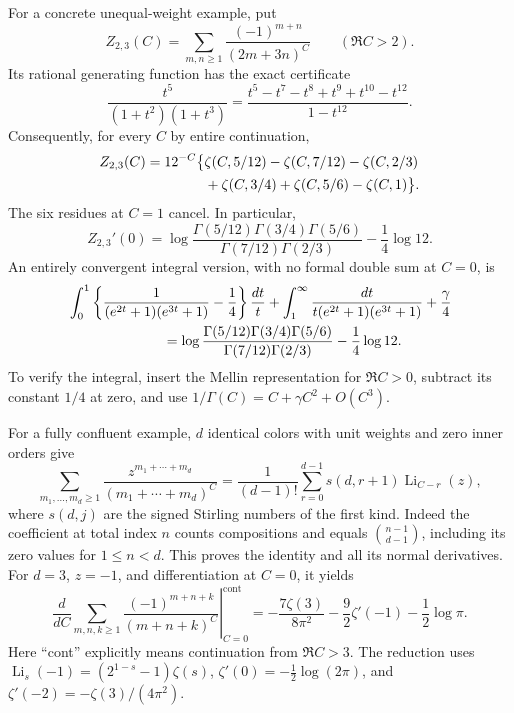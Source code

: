 \documentclass[11pt,a4paper]{article}
\theoremstyle{definition}
\theoremstyle{remark}
\numberwithin{equation}{section}
\begin{document}
For a concrete unequal-weight example, put
\[
 Z_{2,3}(C)=\sum_{m,n\geq1}\frac{(-1)^{m+n}}{(2m+3n)^C}
 \qquad(\Re C>2).
\]
Its rational generating function has the exact certificate
\begin{equation}\label{sp:weightedcertificate}
 \frac{t^5}{(1+t^2)(1+t^3)}
 =\frac{t^5-t^7-t^8+t^9+t^{10}-t^{12}}{1-t^{12}}.
\end{equation}
Consequently, for every $C$ by entire continuation,
\begin{align}\label{sp:weightedHurwitz}
 Z_{2,3}(C)=12^{-C}\bigl\{
  &\zeta(C,5/12)-\zeta(C,7/12)-\zeta(C,2/3)\notag\\
  &+\zeta(C,3/4)+\zeta(C,5/6)-\zeta(C,1)\bigr\}.
\end{align}
The six residues at $C=1$ cancel.  In particular,
\begin{equation}\label{sp:weightedGamma}
 Z_{2,3}'(0)
 =\log\frac{\Gamma(5/12)\Gamma(3/4)\Gamma(5/6)}
                 {\Gamma(7/12)\Gamma(2/3)}-\frac14\log12.
\end{equation}
An entirely convergent integral version, with no formal double sum
at $C=0$, is
\begin{align}\label{sp:weightedIntegral}
 &\int_0^1\left\{\frac1{(e^{2t}+1)(e^{3t}+1)}-\frac14\right\}
                         \frac{dt}{t}
 +\int_1^\infty\frac{dt}{t(e^{2t}+1)(e^{3t}+1)}
 +\frac\gamma4\notag\\
 &\hspace{24mm}=
 \log\frac{\Gamma(5/12)\Gamma(3/4)\Gamma(5/6)}
                 {\Gamma(7/12)\Gamma(2/3)}-\frac14\log12.
\end{align}
To verify the integral, insert the Mellin representation for
$\Re C>0$, subtract its constant $1/4$ at zero, and use
$1/\Gamma(C)=C+\gamma C^2+O(C^3)$.

For a fully confluent example, $d$ identical colors with unit weights
and zero inner orders give
\begin{equation}\label{sp:compositions}
 \sum_{m_1,\ldots,m_d\geq1}
       \frac{z^{m_1+\cdots+m_d}}{(m_1+\cdots+m_d)^C}
 =\frac1{(d-1)!}\sum_{r=0}^{d-1}s(d,r+1)
                         \operatorname{Li}_{C-r}(z),
\end{equation}
where $s(d,j)$ are the signed Stirling numbers of the first kind.
Indeed the coefficient at total index $n$ counts compositions and
equals $\binom{n-1}{d-1}$, including its zero values for $1\leq n<d$.
This proves the identity and all its normal derivatives.  For $d=3$,
$z=-1$, and differentiation at $C=0$, it yields
\begin{equation}\label{sp:triplealternating}
 \left.\frac{d}{dC}
 \sum_{m,n,k\geq1}\frac{(-1)^{m+n+k}}{(m+n+k)^C}
 \right|_{C=0}^{\mathrm{cont}}
 =-\frac{7\zeta(3)}{8\pi^2}
   -\frac92\zeta'(-1)-\frac12\log\pi.
\end{equation}
Here ``cont'' explicitly means continuation from $\Re C>3$.
The reduction uses
$\operatorname{Li}_s(-1)=(2^{1-s}-1)\zeta(s)$,
$\zeta'(0)=-\tfrac12\log(2\pi)$, and
$\zeta'(-2)=-\zeta(3)/(4\pi^2)$.
\end{document}
